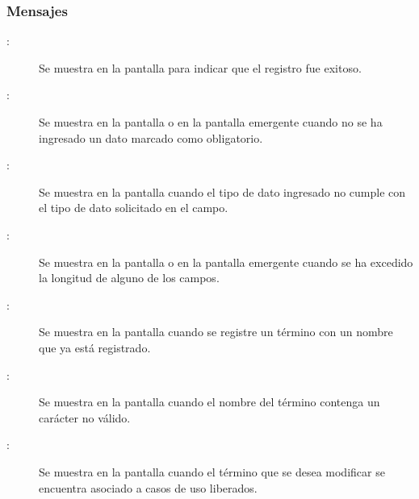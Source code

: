 \subsubsection{Mensajes}
	
\begin{description}
	\item[:] Se muestra en la pantalla  para indicar que el registro fue exitoso.
	\item[:] Se muestra en la pantalla  o en la pantalla emergente  cuando no se ha ingresado un dato marcado como obligatorio.
	\item[:] Se muestra en la pantalla  cuando el tipo de dato ingresado no cumple con el tipo de dato solicitado en el campo.
	\item[:] Se muestra en la pantalla  o en la pantalla emergente  cuando se ha excedido la longitud de alguno de los campos.
	\item[:] Se muestra en la pantalla  cuando se registre un término con un nombre que ya está registrado.
	\item[:] Se muestra en la pantalla  cuando el nombre del término contenga un carácter no válido.
	\item[:] Se muestra en la pantalla  cuando el término que se desea modificar se encuentra asociado a casos de uso liberados.			
\end{description}
